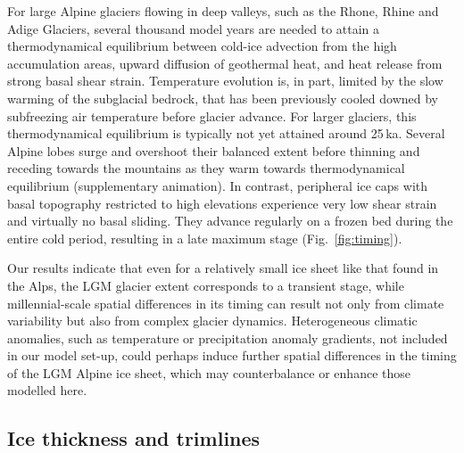 \documentclass[tc, manuscript]{copernicus}
\begin{document}
    For large Alpine glaciers flowing in deep valleys, such as the Rhone,
    Rhine and Adige Glaciers, several thousand model years are needed to attain
    a thermodynamical equilibrium between cold-ice advection from the high
    accumulation areas, upward diffusion of geothermal heat, and heat release
    from strong basal shear strain. Temperature evolution is, in part, limited
    by the slow warming of the subglacial bedrock, that has been previously
    cooled downed by subfreezing air temperature before glacier advance.
    For larger glaciers, this thermodynamical equilibrium is typically not yet
    attained around 25\,ka. Several Alpine lobes surge and overshoot their
    balanced extent before thinning and receding towards the mountains as they
    warm towards thermodynamical equilibrium (supplementary animation). In
    contrast, peripheral ice caps with basal topography restricted to high
    elevations experience very low shear strain and virtually no basal sliding.
    They advance regularly on a frozen bed during the entire cold period,
    resulting in a late maximum stage (Fig.~\ref{fig:timing}).

    Our results indicate that even for a relatively small ice sheet like that
    found in the Alps, the LGM glacier extent corresponds to a transient stage,
    while millennial-scale spatial differences in its timing can result not
    only from climate variability but also from complex glacier dynamics.
    Heterogeneous climatic anomalies, such as temperature or precipitation
    anomaly gradients, not included in our model set-up, could perhaps induce
    further spatial differences in the timing of the LGM Alpine ice sheet,
    which may counterbalance or enhance those modelled here.


\subsection{Ice thickness and trimlines}
\label{sec:thickness}
\end{document}
